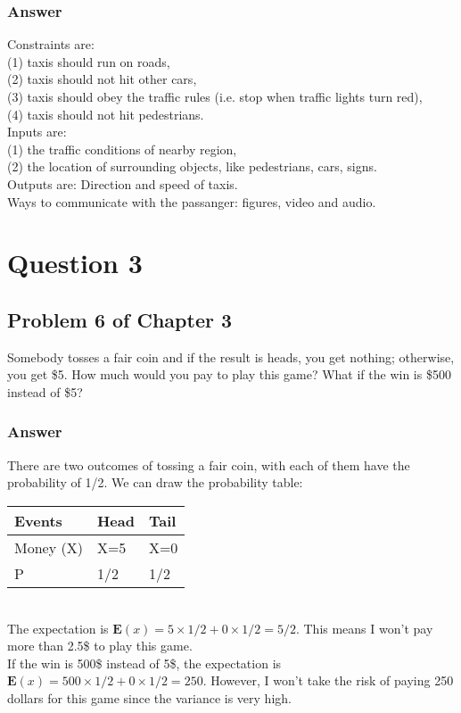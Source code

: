 \documentclass{article}
\begin{document}
\subsubsection*{Answer}

Constraints are: \\
(1) taxis should run on roads,\\ 
(2) taxis should not hit other cars, \\
(3) taxis should obey the traffic rules (i.e. stop when traffic lights turn red), \\
(4) taxis should not hit pedestrians.\\

\noindent Inputs are: \\(1) the traffic conditions of nearby region, \\(2) the location of surrounding objects, like pedestrians, cars, signs.\\

\noindent Outputs are: Direction and speed of taxis.\\

\noindent Ways to communicate with the passanger: figures, video and audio.

\section*{Question 3}
\subsection*{Problem 6 of Chapter 3}
Somebody tosses a fair coin and if the result is heads, you get nothing; otherwise, you get \$5. How much would you pay to play this game? What if the win is \$500 instead of \$5?

\subsubsection*{Answer}
There are two outcomes of tossing a fair coin, with each of them have the probability of 1/2. We can draw the probability table:
\begin{table}[h]
    \begin{tabular}{|l|l|l|}
    \hline
    Events & Head  & Tail  \\ \hline
    Money (X)  & X=5     & X=0     \\ \hline
    P      & 1/2 & 1/2 \\ \hline
    \end{tabular}
    \end{table}
\\The expectation is $\mathbf{E}(x) = 5\times 1/2 + 0 \times 1/2 = 5/2$. This means I won't pay more than 2.5\$ to play this game.
\\If the win is 500\$ instead of 5\$, the expectation is $\mathbf{E}(x) = 500\times 1/2 + 0 \times 1/2 = 250$. However, I won't take the risk of paying 250 dollars for this game since the variance is very high. 
\end{document}
